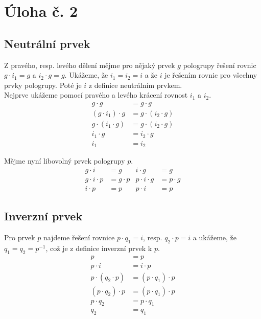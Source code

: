 \documentclass{scrartcl}
\begin{document}
    \section*{Úloha č. 2}
    \subsection*{Neutrální prvek}
    Z pravého, resp. levého dělení mějme pro nějaký prvek $g$ pologrupy řešení rovnic $g \cdot i_1 = g$ a $i_2 \cdot g = g$. Ukážeme, že $i_1 = i_2 = i$ a že $i$ je řešením rovnic pro všechny prvky pologrupy. Poté je $i$ z definice neutrálním prvkem.\\

    Nejprve ukážeme pomocí pravého a levého krácení rovnost $i_1$ a $i_2$.
    \begin{align*}
        g \cdot g &= g \cdot g \\
        (g \cdot i_1) \cdot g &= g \cdot (i_2 \cdot g) \\
        g \cdot (i_1 \cdot g) &= g \cdot (i_2 \cdot g)  \\
        i_1 \cdot g &= i_2 \cdot g \\
        i_1 &= i_2
    \end{align*}

    Mějme nyní libovolný prvek pologrupy $p$.
    \begin{align*}
        g \cdot i &= g  & i \cdot g &= g\\
        g \cdot i \cdot p &= g \cdot p & p \cdot i \cdot g &= p \cdot g \\
        i \cdot p &= p & p \cdot i &= p
    \end{align*}

    \subsection*{Inverzní prvek}
    Pro prvek $p$ najdeme řešení rovnice $p \cdot q_1 = i$, resp. $q_2 \cdot p = i$ a ukážeme, že $q_1 = q_2 = p^{-1}$, což je z definice inverzní prvek k $p$.
    \begin{align*}
        p &= p \\
        p \cdot i &= i \cdot p \\
        p \cdot (q_2 \cdot p) &= (p \cdot q_1) \cdot p \\
        (p \cdot q_2) \cdot p &= (p \cdot q_1) \cdot p \\
        p \cdot q_2 &= p \cdot q_1 \\
        q_2 &= q_1
    \end{align*}
\end{document}
